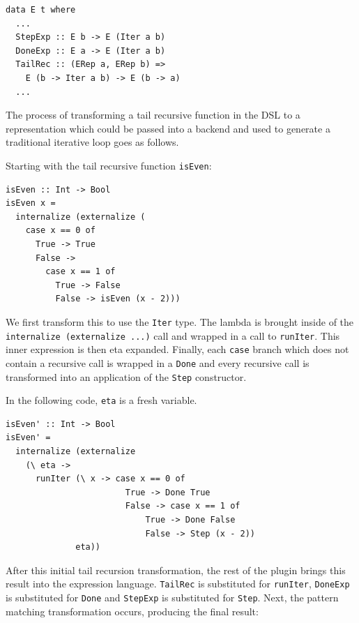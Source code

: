 \documentclass[runningheads, a4paper]{llncs}
\newcommand{\ttt}{\texttt}
\begin{document}
\begin{lstlisting}
data E t where
  ...
  StepExp :: E b -> E (Iter a b)
  DoneExp :: E a -> E (Iter a b)
  TailRec :: (ERep a, ERep b) =>
    E (b -> Iter a b) -> E (b -> a)
  ...
\end{lstlisting}

The process of transforming a tail recursive function in the DSL to a 
representation which could be passed into a backend and used
to generate a traditional iterative loop goes as follows.

Starting with the tail recursive function  \ttt{isEven}:

\begin{lstlisting}
isEven :: Int -> Bool
isEven x =
  internalize (externalize (
    case x == 0 of
      True -> True
      False ->
        case x == 1 of
          True -> False
          False -> isEven (x - 2)))
\end{lstlisting}


We first transform this to use the \verb|Iter| type. The lambda is brought
inside of the \ttt{internalize (externalize ...)} call and wrapped in a call to
\ttt{runIter}. This inner expression is then eta expanded. Finally, each \verb|case|
branch which does not contain a recursive call is wrapped in a \verb|Done| and
every recursive call is transformed into an application of the \verb|Step| constructor.

In the following code, \verb|eta| is a fresh variable.

\begin{lstlisting}
isEven' :: Int -> Bool
isEven' =
  internalize (externalize
    (\ eta ->
      runIter (\ x -> case x == 0 of
                        True -> Done True
                        False -> case x == 1 of
                            True -> Done False
                            False -> Step (x - 2))
              eta))
\end{lstlisting}

After this initial tail recursion transformation, the rest of the plugin brings this
result into the expression language. \verb|TailRec| is substituted for \verb|runIter|,
\verb|DoneExp| is substituted for \verb|Done| and \verb|StepExp| is substituted for \verb|Step|.
Next, the pattern matching transformation occurs, producing the final result:
\end{document}
